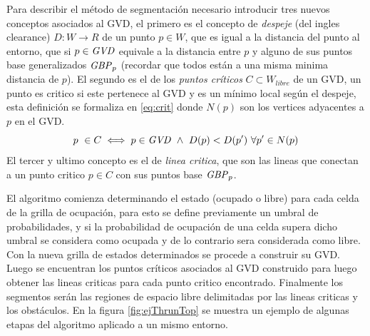 Para describir el método de segmentación necesario introducir tres nuevos conceptos asociados al GVD, el primero es el concepto de \emph{despeje} (del ingles clearance) $D : W \rightarrow R$ de un punto $p \in W$, que es igual a la distancia del punto al entorno, que si $p \in \mathit{GVD}$ equivale a la distancia entre $p$ y alguno de sus puntos base generalizados $\mathit{GBP}_p$ (recordar que todos están a una misma minima distancia de $p$). El segundo es el de los \emph{puntos críticos} $C \subset W_{libre}$ de un GVD, un punto es critico si este pertenece al GVD y es un mínimo local según el despeje, esta definición se formaliza en \ref{eq:crit} donde $N(p)$ son los vertices adyacentes a $p$ en el GVD. 
\begin{equation}
  p\ \in C \iff p \in \mli{GVD}\ \land \ D(p) < D(p')\ \forall p' \in N(p) \label{eq:crit}
\end{equation}
El tercer y ultimo concepto es el de \emph{linea critica}, que son las lineas que conectan a un punto critico $p \in C$ con sus puntos base $\mathit{GBP}_p$.

El algoritmo comienza determinando el estado (ocupado o libre) para cada celda de la grilla de ocupación, para esto se define previamente un umbral de probabilidades, y si la probabilidad de ocupación de una celda supera dicho umbral se considera como ocupada y de lo contrario sera considerada como libre. Con la nueva grilla de estados determinados se procede a construir su  GVD. Luego se encuentran los puntos críticos asociados al GVD construido para luego obtener las lineas criticas para cada punto critico encontrado. Finalmente los segmentos serán las regiones de espacio libre delimitadas por las lineas criticas y los obstáculos. En la figura \ref{fig:ejThrunTop} se muestra un ejemplo de algunas etapas del algoritmo aplicado a un mismo entorno.

